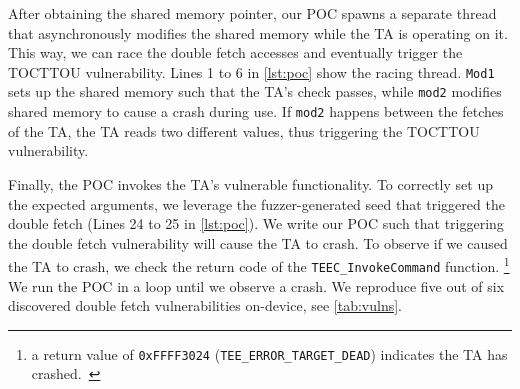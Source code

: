 \documentclass[conference]{IEEEtran}
\newcommand{\teegris}{TEEGris\xspace}
\newcommand{\numvulns}{six\xspace}
\newcommand{\numvulnsrepro}{five\xspace}
\begin{document}



After obtaining the shared memory pointer, 
our POC spawns a separate thread that asynchronously modifies the shared 
memory while the TA is operating on it. This way, we can race the 
double fetch accesses and eventually trigger the TOCTTOU vulnerability. 
Lines 1 to 6 in \autoref{lst:poc} show the racing thread. \texttt{Mod1} sets up the shared memory such that the TA's 
check passes, while \texttt{mod2} modifies shared memory to cause a crash during use.
If \texttt{mod2} happens between 
the fetches of the TA, the TA reads two different values, thus triggering 
the TOCTTOU vulnerability.

Finally, the POC invokes the TA's vulnerable functionality. To correctly 
set up the expected arguments, we leverage the fuzzer-generated 
seed that triggered the double fetch (Lines 24 to 25 in \autoref{lst:poc}).
We write our POC such that triggering the double fetch vulnerability will 
cause the TA to crash. To observe if we caused the TA to crash, we check the 
return code of the \texttt{TEEC\_InvokeCommand} function. \footnote{a return value of \texttt{0xFFFF3024} (\texttt{TEE\_ERROR\_TARGET\_DEAD}) indicates the TA has crashed.~\cite{gpintapi}}
We run the POC in a loop until we observe a crash. 
We reproduce \numvulnsrepro{} out of \numvulns{} discovered 
double fetch vulnerabilities on-device, see \autoref{tab:vulns}.
\end{document}
